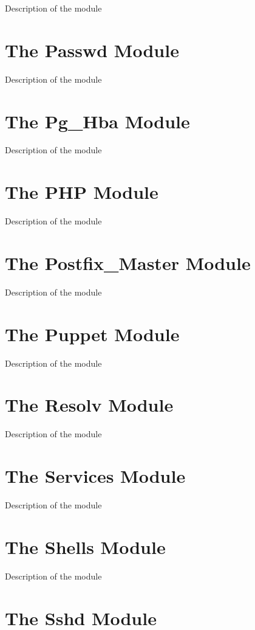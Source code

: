 Description of the module

\section{The Passwd Module}

Description of the module

\section{The Pg\_Hba Module}

Description of the module

\section{The PHP Module}

Description of the module

\section{The Postfix\_Master Module}

Description of the module

\section{The Puppet Module}

Description of the module

\section{The Resolv Module}

Description of the module

\section{The Services Module}

Description of the module

\section{The Shells Module}

Description of the module

\section{The Sshd Module}

